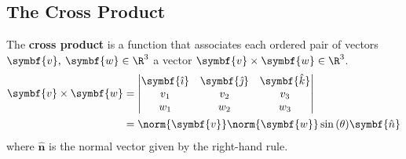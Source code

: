 \documentclass{article}
\begin{document}
\subsection{The Cross Product}
\begin{definition}
    The \textbf{cross product} is a function that associates each
    ordered pair of vectors
    \(\symbf{v},\: \symbf{w}\in \R^3\) a vector
    \(\symbf{v}\times\symbf{w}\in \R^3\).
    \begin{align*}
        \symbf{v}\times\symbf{w} & =
        \begin{vmatrix}
            \symbf{\hat{\imath}} & \symbf{\hat{\jmath}} & \symbf{\hat{k}} \\
            v_1                  & v_2                  & v_3             \\
            w_1                  & w_2                  & w_3
        \end{vmatrix}
        \\
                                 & = \norm{\symbf{v}}\norm{\symbf{w}}\sin{\left(\theta\right)}\symbf{\hat{n}}
    \end{align*}
    where \(\symbf{\hat{n}}\) is the normal vector given by the
    right-hand rule.
\end{definition}
\end{document}
